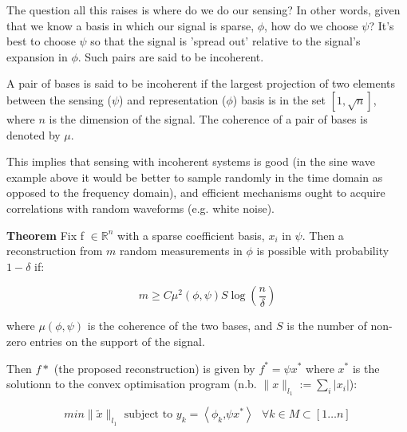 

The question all this raises is where do we do our sensing? In other words, given that we know a basis in which our signal is sparse, \(\phi\), how do we choose \(\psi\)? It's best to choose \(\psi\) so that the signal is 'spread out' relative to the signal's expansion in \(\phi\). Such pairs are said to be incoherent. 

\begin{defn}
A pair of bases is said to be incoherent if the largest projection of two elements between the sensing (\(\psi\)) and representation (\(\phi\)) basis  is in the set \( [1 , \sqrt{n}] \), where \( n \) is the dimension of the signal. The coherence of a pair of bases is denoted by \(\mu\).
\end{defn}

This implies that sensing with incoherent systems is good (in the sine wave example above it would be better to sample randomly in the time domain as opposed to the frequency domain), and efficient mechanisms ought to acquire correlations with random waveforms (e.g. white noise).

\textbf{Theorem} \cite{Candes2006}
Fix f \(\in \mathbb{R}^n\) with a sparse coefficient basis, \(x_{i}\) in \(\psi\). Then a reconstruction from \(m\) random measurements in \(\phi\) is possible with probability \(1 - \delta\) if: 

\begin{equation}
m \geq C \mu^2(\phi, \psi) S \log\left(\frac{n}{\delta}\right)
\end{equation}
\label{minsamples}

where \( \mu(\phi, \psi)\) is the coherence of the two bases, and \(S\) is the number of non-zero entries on the support of the signal.

Then \(f*\) (the proposed reconstruction) is given by \(f^* = \psi x^*\) where \(x^*\) is the solutionn to the convex optimisation program (n.b. \(\| x\|_{l_{1}} := \sum_{i} |x_{i}| \)):

\begin{equation}
min\|\tilde{x}\|_{l_{1}} \text{ subject to } y_{k} = \left\langle \phi_{k} \text{,} \psi x^* \right\rangle \text{   } \forall k \in M \subset [1 \ldots n]
\end{equation}
\label{program0}

